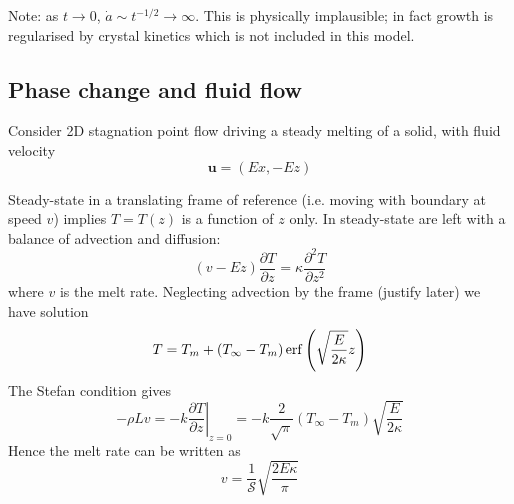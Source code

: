 \documentclass{jknotes}
\begin{document}
Note: as $t \to 0$, $\dot{a} \sim t^{-1/2} \to \infty$. This is physically
implausible; in fact growth is regularised by crystal kinetics which is not
included in this model.

\subsection{Phase change and fluid flow}
Consider 2D stagnation point flow driving a steady melting of a solid, with
fluid velocity
\begin{equation}
	\symbf{u} = (Ex, -Ez)
\end{equation}
\begin{center}
\end{center}

Steady-state in a translating frame of reference (i.e. moving with boundary at
speed $v$) implies $T = T(z)$ is a function of $z$ only. In steady-state are
left with a balance of advection and diffusion:
\begin{equation}
	(v-Ez)\frac{\partial T}{\partial z} = \kappa \frac{\partial^2 T}{\partial
	z^2}
\end{equation}
where $v$ is the melt rate. Neglecting advection by the frame (justify later)
we have solution
\begin{equation}
	T = T_m + (T_{\infty} - T_m) \erf \left( \sqrt{\frac{E}{2\kappa}} z \right)
\end{equation}
The Stefan condition gives
\begin{equation}
	-\rho L v = - k\left.\frac{\partial T}{\partial z} \right|_{z=0} = -k
	\frac{2}{\sqrt{\pi}} (T_\infty - T_m) \sqrt{\frac{E}{2\kappa}}
\end{equation}
Hence the melt rate can be written as
\begin{equation}
	v = \frac{1}{\mathcal{S}} \sqrt{\frac{2E \kappa}{\pi}}
\end{equation}
\end{document}
